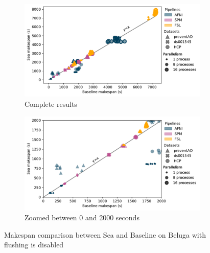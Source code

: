 \begin{figure}

\begin{subfigure}{\textwidth}
    \centering
    \captionsetup{width=.85\linewidth}
    \includegraphics[width=\columnwidth]{figures/sea-neuro/beluga_withoutflush_nozoom.pdf}%
    \caption{Complete results}\label{fig:seaneuro:belugafull}
\end{subfigure}
\begin{subfigure}{\textwidth}
    \centering
    \captionsetup{width=.85\linewidth}
    \includegraphics[width=\linewidth]{figures/sea-neuro/beluga_withoutflush_zoom.pdf}
    \caption{Zoomed between 0 and 2000 seconds}\label{fig:seaneuro:belugazoom}
\end{subfigure}
\caption{Makespan comparison between Sea and Baseline on Beluga with flushing is disabled}
\label{fig:seaneuro:beluga-noflush}
\end{figure}

